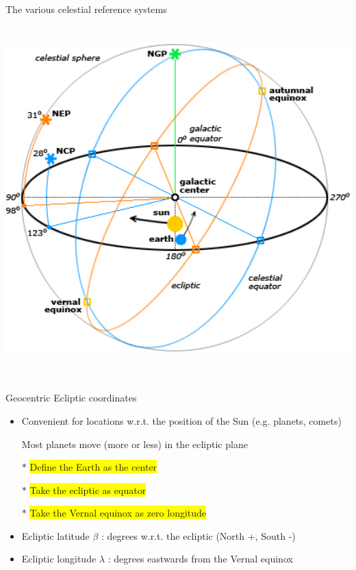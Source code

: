 \Tr
\onecolumn
\begin{center}
{\blue The various celestial reference systems}\\[3mm]
\includegraphics[keepaspectratio,height=14cm]{celestial-refs}
\end{center}

\Tr
\onecolumn
\begin{center}
{\red Geocentric Ecliptic coordinates}
\end{center}
%
\begin{itemize}
\item Convenient for locations w.r.t. the position of the Sun (e.g. planets, comets)
\item[] Most planets move (more or less) in the ecliptic plane
\item[$\ast$] \colorbox{yellow}{Define the Earth as the center}
\item[$\ast$] \colorbox{yellow}{Take the ecliptic as equator}
\item[$\ast$] \colorbox{yellow}{Take the Vernal equinox as zero longitude}
\item {\blue Ecliptic latitude $\beta$} : degrees w.r.t. the ecliptic (North +, South -)
\item {\blue Ecliptic longitude $\lambda$} : degrees eastwards from the Vernal equinox
\end{itemize}

